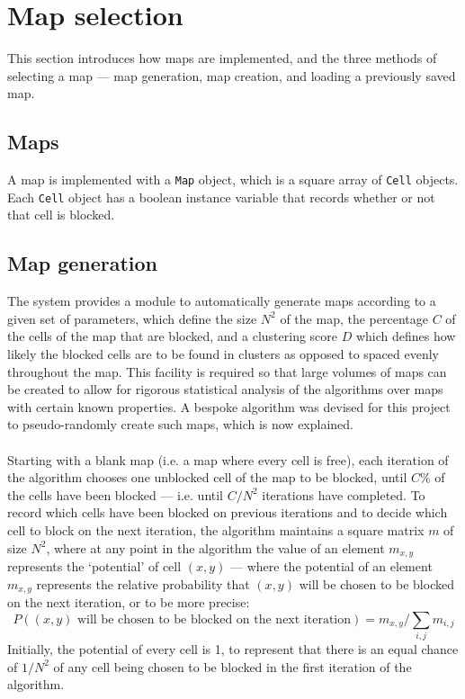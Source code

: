 \documentclass[12pt,notitlepage]{report}
\begin{document}
\section{Map selection}

This section introduces how maps are implemented, and the three methods of selecting a map --- map generation, map creation, and loading a previously saved map.\\

\subsection{Maps}
A map is implemented with a {\tt Map} object, which is a square array of {\tt Cell} objects. Each {\tt Cell} object has a boolean instance variable that records whether or not that cell is blocked.

\subsection{Map generation}
The system provides a module to automatically generate maps according to a given set of parameters, which define the size $N^{2}$ of the map, the percentage $C$ of the cells of the map that are blocked, and a clustering score $D$ which defines how likely the blocked cells are to be found in clusters as opposed to spaced evenly throughout the map. This facility is required so that large volumes of maps can be created to allow for rigorous statistical analysis of the algorithms over maps with certain known properties. A bespoke algorithm was devised for this project to pseudo-randomly create such maps, which is now explained.\\

\\
\noindent
Starting with a blank map (i.e. a map where every cell is free), each iteration of the algorithm chooses one unblocked cell of the map to be blocked, until $C\%$ of the cells have been blocked --- i.e. until $C/N^{2}$ iterations have completed. To record which cells have been blocked on previous iterations and to decide which cell to block on the next iteration, the algorithm maintains a square matrix $m$ of size $N^{2}$, where at any point in the algorithm the value of an element $m_{x,y}$ represents the `potential' of cell $(x,y)$ --- where the potential of an element $m_{x,y}$ represents the relative probability that $(x,y)$ will be chosen to be blocked on the next iteration, or to be more precise: 
\begin{equation}
P((x,y) \mbox{ will be chosen to be blocked on the next iteration}) = m_{x,y}/\sum\limits_{i,j} m_{i,j}
\end{equation}
\noindent
Initially, the potential of every cell is 1, to represent that there is an equal chance of $1/N^{2}$ of any cell being chosen to be blocked in the first iteration of the algorithm.\\
\end{document}
